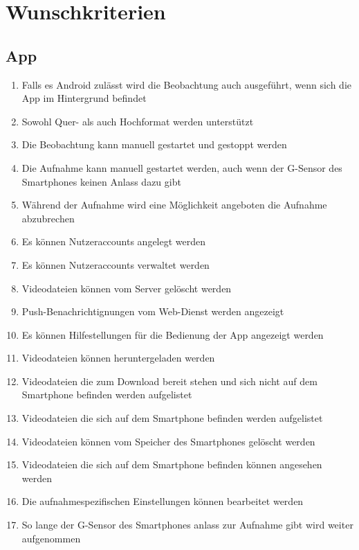 \section{Wunschkriterien}
\subsection{App}
	\begin{enumerate}
	\renewcommand{\labelenumi}{\textbf{\theenumi}}
	\renewcommand{\theenumi}{WK\arabic{enumi}0}
	\setcounter{enumi}{99}
	\item Falls es \gls{Android} zulässt wird die Beobachtung auch ausgeführt, wenn sich die \gls{App} im Hintergrund befindet
	\item Sowohl Quer- als auch Hochformat werden unterstützt
	\item Die Beobachtung kann manuell gestartet und gestoppt werden
	\item Die Aufnahme kann manuell gestartet werden, auch wenn der \gls{G-Sensor} des Smartphones keinen Anlass dazu gibt
	\item Während der Aufnahme wird eine Möglichkeit angeboten die Aufnahme abzubrechen
	\item Es können Nutzeraccounts angelegt werden
	\item Es können Nutzeraccounts verwaltet werden
	\item {} Videodateien können vom Server gelöscht werden
	\item Push-Benachrichtignungen vom \gls{Web-Dienst} werden angezeigt
	\item Es können Hilfestellungen für die Bedienung der \gls{App} angezeigt werden
	\item {} Videodateien können heruntergeladen werden
	\item {} Videodateien die zum Download bereit stehen und sich nicht auf dem \gls{Smartphone} befinden werden aufgelistet
	\item {} Videodateien die sich auf dem \gls{Smartphone} befinden  werden aufgelistet
	\item {} Videodateien können vom Speicher des \glspl{Smartphone} gelöscht werden
	\item {} Videodateien die sich auf dem \gls{Smartphone} befinden können angesehen werden
	\item Die aufnahmespezifischen Einstellungen können bearbeitet werden
	\item So lange der \gls{G-Sensor} des Smartphones anlass zur Aufnahme gibt wird weiter aufgenommen
	\end{enumerate}
